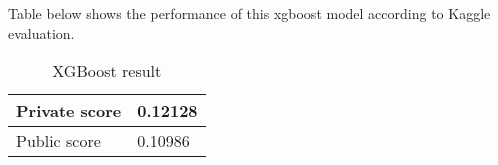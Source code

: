 Table below shows the performance of this xgboost model according to Kaggle evaluation. 
\begin{table}[h]
	\centering
	\caption{XGBoost result}
	\label{tab:xgboost_result}
	\begin{tabular}{|m{100pt}|m{50pt}|}
		\hline
		Private score & 0.12128 \\ \hline
		Public score  & 0.10986 \\ \hline
	\end{tabular}
\end{table}	